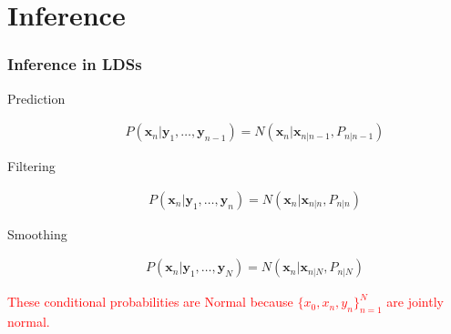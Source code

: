 \section{Inference}

\begin{frame}
    \frametitle{Inference in LDSs}

\begin{description}
    \item[Prediction]
        \begin{align}
            P(\mathbf{x}_n|\mathbf{y}_1,\ldots,\mathbf{y}_{n-1})=N(\mathbf{x}_n|\mathbf{x}_{n|n-1},P_{n|n-1})\nonumber
        \end{align}
    \item[Filtering]
        \begin{align}
            P(\mathbf{x}_n|\mathbf{y}_1,\ldots,\mathbf{y}_{n})=N(\mathbf{x}_n|\mathbf{x}_{n|n},P_{n|n})\nonumber
        \end{align}
    \item[Smoothing]
        \begin{align}
            P(\mathbf{x}_n|\mathbf{y}_1,\ldots,\mathbf{y}_{N})=N(\mathbf{x}_n|\mathbf{x}_{n|N},P_{n|N})\nonumber
        \end{align}
\end{description}

    \textcolor{red}{{These conditional probabilities are Normal
    because $\{x_0, x_n, y_n\}_{n=1}^N$ are jointly normal.}}

\end{frame}

